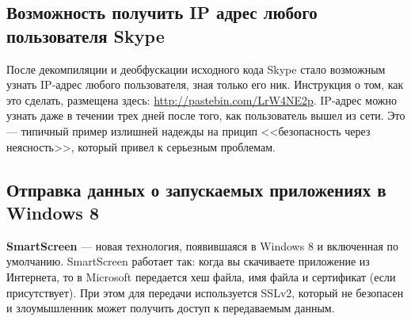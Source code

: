 \subsection{Возможность получить IP адрес любого пользователя Skype}
После декомпиляции и деобфускации исходного кода Skype стало возможным узнать IP-адрес любого пользователя, зная только его ник. Инструкция о том, как это сделать, размещена здесь: \url{http://pastebin.com/LrW4NE2p}. IP-адрес можно узнать даже в течении трех дней после того, как пользователь вышел из сети. Это --- типичный пример излишней надежды на прицип <<безопасность через неясность>>, который привел к серьезным проблемам.
\subsection{Отправка данных о запускаемых приложениях в Windows 8}
\textbf{SmartScreen} --- новая технология, появившаяся в Windows 8 и включенная по умолчанию\cite{smartscreen}. SmartScreen работает так: когда вы скачиваете приложение из Интернета, то в Microsoft передается хеш файла, имя файла и сертификат (если присутствует)\cite{smartscreen_withinwindows}. При этом для передачи используется SSLv2, который не безопасен и злоумышленник может получить доступ к передаваемым данным\cite{smartscreen_nadim}.


